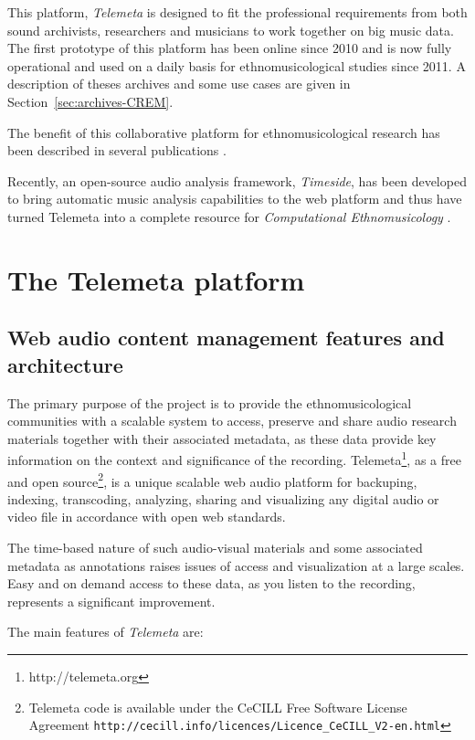 \documentclass{paper}
\begin{document}
  This platform, \emph{Telemeta} is designed to fit the professional requirements from both sound archivists, researchers and musicians to work together on big music data. The first prototype of this platform has been online since 2010 and is now fully operational and used on a daily basis for ethnomusicological studies since 2011. A description of theses archives and some use cases are given in Section~\ref{sec:archives-CREM}.

The benefit of this collaborative platform for ethnomusicological research has been described in several publications \citep{Simmonot_IASA_2011, Julien_IASA_2011, Simonnot_ICTM_2014}.

Recently, an open-source audio analysis framework, \emph{Timeside}, has been developed to bring automatic music analysis capabilities to the web platform and thus have turned Telemeta into a complete resource for \emph{Computational Ethnomusicology} \citep{Tzanetakis_2007_JIMS, Gomez_JNMR_2013}.

 \section{The Telemeta platform}\label{sec:Telemeta}
 \subsection{Web audio content management features and architecture}
The primary purpose of the project is to provide the ethnomusicological communities with a scalable system to access, preserve and share audio research materials together with their associated metadata, as these data provide key information on the context and significance of the recording. Telemeta\footnote{http://telemeta.org}, as a free and open source\footnote{Telemeta code is available under the CeCILL Free Software License Agreement \texttt{http://cecill.info/licences/Licence\_CeCILL\_V2-en.html}}, is a unique scalable web audio platform for backuping, indexing, transcoding, analyzing, sharing and visualizing any digital audio or video file in accordance with open web standards.

The time-based nature of such audio-visual materials and some associated metadata as annotations raises issues of access and visualization at a large scales. Easy and on demand access to these data, as you listen to the recording, represents a significant improvement.

The main features of \emph{Telemeta} are:
\end{document}
